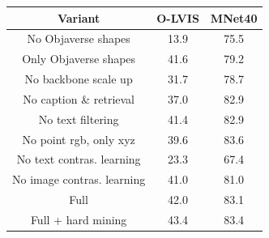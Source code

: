   \scriptsize
  \setlength{\tabcolsep}{3pt}
  \vspace{-1em}
    \begin{tabular}{c|cc}
    \toprule
    Variant & O-LVIS  & MNet40 \\
    \midrule
    No Objaverse shapes &   13.9    & 75.5  \\
    Only Objaverse shapes &  41.6     & 79.2 \\
    No backbone scale up &  31.7     & 78.7  \\
    \midrule
    No caption \& retrieval &  37.0 & 82.9 \\
    No text filtering & 41.4  & 82.9 \\
    \midrule
    No point rgb, only xyz &    39.6   & 83.6  \\
    No text contras. learning &  23.3 & 67.4 \\
    No image contras. learning &  41.0     & 81.0  \\
    \midrule
    Full  &    42.0   &  83.1 \\
    Full + hard mining & 43.4 & 83.4  \\
    \bottomrule
    \end{tabular}

